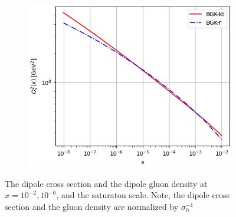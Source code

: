 \documentclass[12pt]{article}
\numberwithin{equation}{section}
\numberwithin{table}{section}
\numberwithin{figure}{section}
\begin{document}
\begin{figure}[t]
\begin{subfigure}{0.47\textwidth}
\includegraphics[width=\textwidth]{./plots/BGK-saturation.png}
\end{subfigure}
\caption{The dipole cross section and the dipole gluon density at
$x=10^{-2}, 10^{-6}$, and the saturaton scale. 
Note, the dipole cross section and the gluon density are normalized by $\sigma_0^{-1}$}
\label{fig:BGK}
\end{figure}
\end{document}
